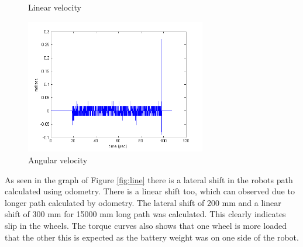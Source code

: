 \begin{figure}
\begin{minipage}[t]{0.5\textwidth}
		\caption{Linear velocity}\label{fig:linVel}
	\end{minipage}
	\hfill
	\begin{minipage}[t]{0.5\textwidth}
		\centering
		\includegraphics[width=3.1in]{Chapter5/fig/linOmega} 
		\caption{Angular velocity}\label{fig:linOmega}
	\end{minipage}
\end{figure}

As seen in the graph of Figure \ref{fig:line} there is a lateral shift in the robots path calculated using odometry.  There is a linear shift too, which can observed due to longer path calculated by odometry. The lateral shift of 200 mm and a linear shift of 300 mm for 15000 mm long path was calculated. This clearly indicates slip in the wheels. The torque curves also shows that one wheel is more loaded that the other this is expected as the battery weight was on one side of the robot.

